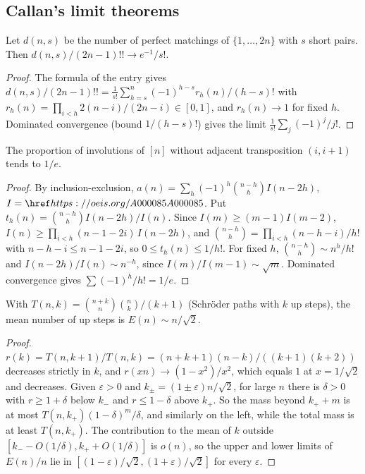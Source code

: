 \subsection{Callan's limit theorems}\label{s:callan}
\begin{proposition}[\oeis{A079267}]\label{s:A079267} Let $d(n,s)$ be the number of perfect matchings of
$\{1,\dots,2n\}$ with $s$ short pairs. Then $d(n,s)/(2n-1)!!\to e^{-1}/s!$.\end{proposition}
\begin{proof} The formula of the entry gives $d(n,s)/(2n-1)!!=\frac1{s!}\sum_{h=s}^n(-1)^{h-s}r_h(n)/(h-s)!$ with
$r_h(n)=\prod_{i<h}2(n-i)/(2n-i)\in[0,1]$, and $r_h(n)\to1$ for fixed $h$. Dominated convergence (bound
$1/(h-s)!$) gives the limit $\frac1{s!}\sum_j(-1)^j/j!$. \end{proof}
\begin{proposition}[\oeis{A170941}]\label{s:A170941} The proportion of involutions of $[n]$ without adjacent
transposition $(i,i+1)$ tends to $1/e$.\end{proposition}
\begin{proof} By inclusion-exclusion, $a(n)=\sum_h(-1)^h\binom{n-h}{h}I(n-2h)$, $I=\oeis{A000085}$. Put
$t_h(n)=\binom{n-h}hI(n-2h)/I(n)$. Since $I(m)\ge(m-1)I(m-2)$, $I(n)\ge\prod_{i<h}(n-1-2i)\,I(n-2h)$, and
$\binom{n-h}h=\prod_{i<h}(n-h-i)/h!$ with $n-h-i\le n-1-2i$, so $0\le t_h(n)\le1/h!$. For fixed $h$,
$\binom{n-h}h\sim n^h/h!$ and $I(n-2h)/I(n)\sim n^{-h}$, since $I(m)/I(m-1)\sim\sqrt m$. Dominated convergence gives
$\sum(-1)^h/h!=1/e$. \end{proof}
\begin{proposition}[\oeis{A088617}]\label{s:A088617} With $T(n,k)=\binom{n+k}n\binom nk/(k+1)$ (Schröder paths
with $k$ up steps), the mean number of up steps is $E(n)\sim n/\sqrt2$.\end{proposition}
\begin{proof} $r(k)=T(n,k+1)/T(n,k)=(n+k+1)(n-k)/((k+1)(k+2))$ decreases strictly in $k$, and $r(xn)\to(1-x^2)/x^2$,
which equals $1$ at $x=1/\sqrt2$ and decreases. Given $\varepsilon>0$ and $k_\pm=(1\pm\varepsilon)n/\sqrt2$, for large
$n$ there is $\delta>0$ with $r\ge1+\delta$ below $k_-$ and $r\le1-\delta$ above $k_+$. So the mass beyond
$k_++m$ is at most $T(n,k_+)(1-\delta)^m/\delta$, and similarly on the left, while the total mass is at least
$T(n,k_+)$. The contribution to the mean of $k$ outside $[k_--O(1/\delta),k_++O(1/\delta)]$ is $o(n)$, so the
upper and lower limits of $E(n)/n$ lie in $[(1-\varepsilon)/\sqrt2,(1+\varepsilon)/\sqrt2]$ for every $\varepsilon$.
\end{proof}

